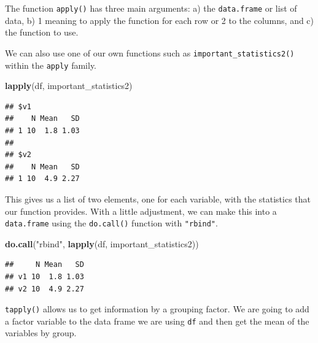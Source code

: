 \documentclass[]{tufte-book}
\newenvironment{Shaded}{}{}
\newcommand{\KeywordTok}[1]{\textcolor[rgb]{0.00,0.44,0.13}{\textbf{#1}}}
\newcommand{\DataTypeTok}[1]{\textcolor[rgb]{0.56,0.13,0.00}{#1}}
\newcommand{\DecValTok}[1]{\textcolor[rgb]{0.25,0.63,0.44}{#1}}
\newcommand{\StringTok}[1]{\textcolor[rgb]{0.25,0.44,0.63}{#1}}
\newcommand{\OtherTok}[1]{\textcolor[rgb]{0.00,0.44,0.13}{#1}}
\newcommand{\OperatorTok}[1]{\textcolor[rgb]{0.40,0.40,0.40}{#1}}
\newcommand{\NormalTok}[1]{#1}
\theoremstyle{definition}
\theoremstyle{definition}
\theoremstyle{remark}
\begin{document}
The function \texttt{apply()} has three main arguments: a) the
\texttt{data.frame} or list of data, b) 1 meaning to apply the function
for each row or 2 to the columns, and c) the function to use.

We can also use one of our own functions such as
\texttt{important\_statistics2()} within the \texttt{apply} family.

\begin{Shaded}
\begin{Highlighting}[]
\KeywordTok{lapply}\NormalTok{(df, important_statistics2)}
\end{Highlighting}
\end{Shaded}

\begin{verbatim}
## $v1
##    N Mean   SD
## 1 10  1.8 1.03
## 
## $v2
##    N Mean   SD
## 1 10  4.9 2.27
\end{verbatim}

This gives us a list of two elements, one for each variable, with the
statistics that our function provides. With a little adjustment, we can
make this into a \texttt{data.frame} using the \texttt{do.call()}
function with \texttt{"rbind"}.

\begin{Shaded}
\begin{Highlighting}[]
\KeywordTok{do.call}\NormalTok{(}\StringTok{"rbind"}\NormalTok{, }\KeywordTok{lapply}\NormalTok{(df, important_statistics2))}
\end{Highlighting}
\end{Shaded}

\begin{verbatim}
##     N Mean   SD
## v1 10  1.8 1.03
## v2 10  4.9 2.27
\end{verbatim}

\texttt{tapply()} allows us to get information by a grouping factor. We
are going to add a factor variable to the data frame we are using
\texttt{df} and then get the mean of the variables by group.

\begin{Shaded}
\end{Shaded}
\end{document}
